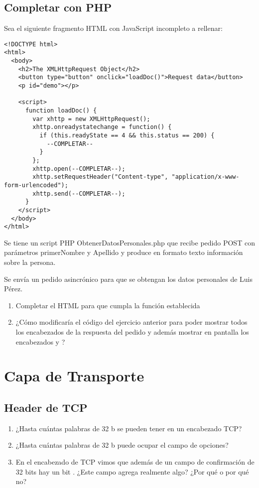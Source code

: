 \documentclass[12pt]{report}
\begin{document}
\begin{exer}
\section{Completar con PHP \stwo}
Sea el siguiente fragmento HTML con JavaScript incompleto a rellenar:

\begin{verbatim}
<!DOCTYPE html>
<html>
  <body>
    <h2>The XMLHttpRequest Object</h2>
    <button type="button" onclick="loadDoc()">Request data</button>
    <p id="demo"></p>

    <script>
      function loadDoc() {
        var xhttp = new XMLHttpRequest();
        xhttp.onreadystatechange = function() {
          if (this.readyState == 4 && this.status == 200) {
            --COMPLETAR--
          }
        };
        xhttp.open(--COMPLETAR--);
        xhttp.setRequestHeader("Content-type", "application/x-www-form-urlencoded");
        xhttp.send(--COMPLETAR--);
      }
    </script>
  </body>
</html>
\end{verbatim}

Se tiene un script PHP ObtenerDatosPersonales.php que recibe pedido POST con parámetros
primerNombre y Apellido y produce en formato texto información sobre la persona.

Se envía un pedido asincrónico para que se obtengan los datos personales de Luis Pérez.

\begin{enumerate}
\item Completar el HTML para que cumpla la función establecida
\item ¿Cómo modificaría el código del ejercicio anterior para poder mostrar todos los
encabezados de la respuesta del pedido y además mostrar en pantalla los encabezados
 y ?
\end{enumerate}
\end{exer}

%
%

\chapter{Capa de Transporte}

\begin{exer}
\section{Header de TCP \sthree \steo}
\begin{enumerate}
\item ¿Hasta cuántas palabras de 32 b se pueden tener en un encabezado TCP?
\item ¿Hasta cuántas palabras de 32 b puede ocupar el campo de opciones?
\item En el encabezado de TCP vimos que además de un campo de confirmación de 32 bits hay
un bit . ¿Este campo agrega realmente algo? ¿Por qué o por qué no?
\end{enumerate}
\end{exer}
\end{document}
